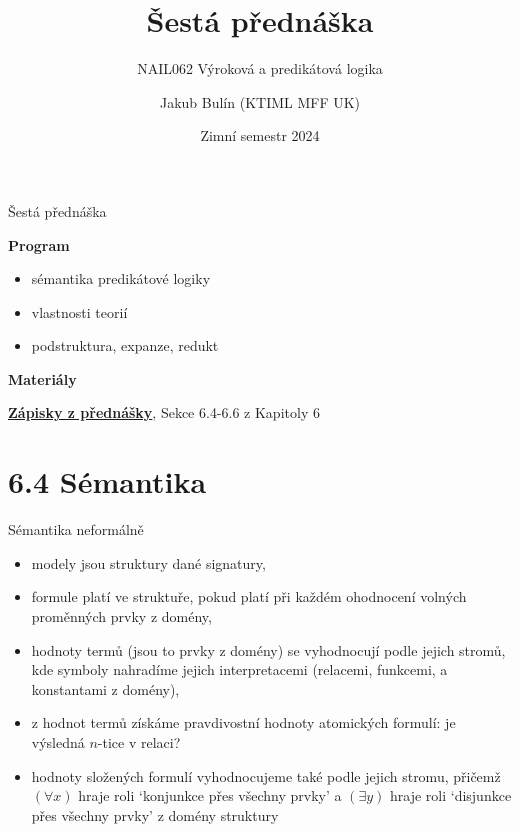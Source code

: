 \documentclass{beamer}
\title{Šestá přednáška}
\subtitle{NAIL062 Výroková a predikátová logika}
\author{Jakub Bulín (KTIML MFF UK)}
\date{Zimní semestr 2024}
\begin{document}
\maketitle


\begin{frame}{Šestá přednáška}

    \textbf{Program}
        \begin{itemize}
            \item sémantika predikátové logiky 
            \item vlastnosti teorií
            \item podstruktura, expanze, redukt
            
        \end{itemize}

    \textbf{Materiály}

        \href{https://github.com/jbulin-mff-uk/nail062/raw/main/lecture/lecture-notes/lecture-notes.pdf}{\alert{\textbf{Zápisky z přednášky}}}, Sekce 6.4-6.6 z Kapitoly 6

\end{frame}


\section{6.4 Sémantika}


\begin{frame}{Sémantika neformálně}

    \begin{itemize}[<+->]
        \item \alert{modely jsou struktury} dané signatury,
        \item formule \alert{platí} ve struktuře, pokud platí při každém ohodnocení volných proměnných prvky z domény,
        \item \alert{hodnoty termů} (jsou to prvky z domény) se vyhodnocují podle jejich stromů, kde symboly nahradíme jejich interpretacemi (relacemi, funkcemi, a konstantami z domény),
        \item z hodnot termů získáme \alert{pravdivostní hodnoty atomických formulí}: je výsledná $n$-tice v relaci?
        \item hodnoty složených formulí vyhodnocujeme také podle jejich stromu, přičemž \alert{$(\forall x)$ hraje roli `konjunkce přes všechny prvky'} a  \alert{$(\exists y)$ hraje roli `disjunkce přes všechny prvky'} z domény struktury
    \end{itemize}    

\end{frame}
\end{document}
